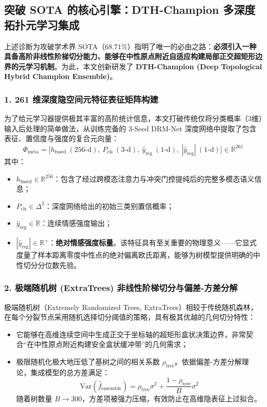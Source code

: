 \subsection{突破 SOTA 的核心引擎：DTH-Champion 多深度拓扑元学习集成}
上述诊断为攻破学术界 SOTA（$68.71\%$）指明了唯一的必由之路：\textbf{必须引入一种具备高阶非线性阶梯切分能力、能够在中性原点附近自适应构建局部正交超矩形边界的元学习机制}。为此，本文创新研发了 \textbf{DTH-Champion (Deep Topological Hybrid Champion Ensemble)}。

\subsubsection{1. 261 维深度隐空间元特征表征矩阵构建}
为了给元学习器提供极其丰富的高阶统计信息，本文打破传统仅将分类概率（3维）输入后处理的简单做法，从训练完备的 3-Seed DRM-Net 深度网络中提取了包含表征、置信度与强度的复合元向量：
\begin{equation}
\Phi_{\text{meta}} = \big[ h_{\text{fused}} \ (256\text{-d}), \ P_{\text{cls}} \ (3\text{-d}), \ \hat{y}_{\text{reg}} \ (1\text{-d}), \ |\hat{y}_{\text{reg}}| \ (1\text{-d}) \big] \in \mathbb{R}^{261}
\end{equation}
其中：
\begin{itemize}
    \item $h_{\text{fused}} \in \mathbb{R}^{256}$：包含了经过跨模态注意力与冲突门控提纯后的完整多模态语义信息；
    \item $P_{\text{cls}} \in \Delta^2$：深度网络给出的初始三类别置信概率；
    \item $\hat{y}_{\text{reg}} \in \mathbb{R}$：连续情感强度输出；
    \item $|\hat{y}_{\text{reg}}| \in \mathbb{R}^+$：\textbf{绝对情感强度标量}。该特征具有至关重要的物理意义——它显式度量了样本距离零度中性点的绝对偏离欧氏距离，能够为树模型提供明确的中性切分分位数先验。
\end{itemize}

\subsubsection{2. 极端随机树 (ExtraTrees) 非线性阶梯切分与偏差-方差分解}
极端随机树（Extremely Randomized Trees, ExtraTrees）\cite{geurts2006extremely}相较于传统随机森林，在每个分裂节点采用随机选择切分阈值的策略，具有极其优越的几何切分特性：
\begin{itemize}
    \item 它能够在高维连续空间中生成正交于坐标轴的超矩形盒状决策边界，非常契合“在中性原点附近构建安全盒状缓冲带”的几何需求；
    \item 极限随机化极大地压低了基树之间的相关系数 $\rho_{\text{tree}}$。依据偏差-方差分解理论，集成模型的总方差满足：
    \begin{equation}
    \text{Var}(\hat{f}_{\text{ensemble}}) = \rho_{\text{tree}} \sigma^2 + \frac{1 - \rho_{\text{tree}}}{B} \sigma^2
    \end{equation}
    随着树数量 $B \to 300$，方差项被强力压缩，有效防止在高维隐表征上过拟合。
\end{itemize}

